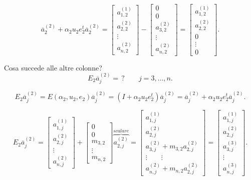\begin{dimo}
\[
\overline{a}_2^{(2)} + \alpha_2u_2e_2^t\overline{a}_2^{(2)} =
\left[\begin{array}{c}
a_{1,2}^{(1)} \\
a_{2,2}^{(2)} \\
\vdots \\
a_{n,2}^{(2)}
\end{array}\right]- \left[\begin{array}{c}
0 \\
0 \\
a_{3,2}^{(2)} \\
\vdots \\
a_{n,2}^{(2)}
\end{array}\right] =
\left[\begin{array}{c}
a_{1,2}^{(1)} \\
a_{2,2}^{(2)} \\
0 \\
\vdots \\
0
\end{array}\right].
\]

Cosa succede alle altre colonne?
\[E_2\overline{a}_j^{(2)} = \,? \qquad j = 3, \ldots, n.\]

\[E_2\overline{a}_j^{(2)} = E(\alpha_2, u_2, e_2)\overline{a}_j^{(2)} =
(I + \alpha_2u_2e_2^t)\overline{a}_j^{(2)} = \overline{a}_j^{(2)} +
\alpha_2u_2e_2^t\overline{a}_j^{(2)}.
\]

\[
E_2\overline{a}_j^{(2)} =
\left[
\begin{array}{c}
a_{1,j}^{(1)} \\
a_{2,j}^{(2)} \\
\vdots \\
a_{n,j}^{(2)}
\end{array}
\right]
+
\left[
\begin{array}{c}
0 \\
0 \\
m_{3,2} \\
\vdots \\
m_{n,2}
\end{array}
\right] \overbrace{a_{2,j}^{(2)}}^{scalare}
=
\left[
\begin{array}{l}
a_{1,j}^{(1)} \\
a_{2,j}^{(2)} \\
a_{3,j}^{(2)} + m_{3,2} a_{2,j}^{(2)}\\
\vdots \qquad \vdots \\
a_{n,j}^{(2)} +m_{n,2} a_{2,j}^{(2)}
\end{array}
\right]
=
\left[
\begin{array}{l}
a_{1,j}^{(1)} \\
a_{2,j}^{(2)} \\
a_{3,j}^{(3)} \\
\vdots \\
a_{n,j}^{(3)}
\end{array}
\right].
\]


\end{dimo}
